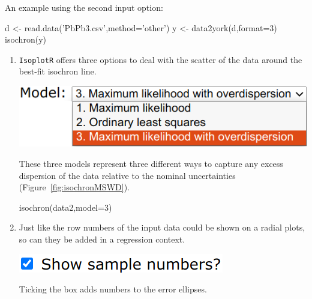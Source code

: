 \begin{refsection}
An example using the second input option:

\begin{script}
d <- read.data('PbPb3.csv',method='other')
y <- data2york(d,format=3)
isochron(y)
\end{script}

\begin{enumerate}

\item \texttt{IsoplotR} offers three options to deal with the scatter of the
  data around the best-fit isochron line.

\noindent\begin{minipage}[t]{.45\linewidth}
\strut\vspace*{-\baselineskip}\newline
\includegraphics[width=\linewidth]{../figures/OtherRegressionModels.png}
\end{minipage}
\begin{minipage}[t]{.55\linewidth}
  These three models represent three different ways to capture any
  excess dispersion of the data relative to the nominal uncertainties
  (Figure~\ref{fig:isochronMSWD}).
\end{minipage}

\begin{console}
isochron(data2,model=3)
\end{console}
  
\item Just like the row numbers of the input data could be shown on a
  radial plots, so can they be added in a regression context.

  \noindent\begin{minipage}[t]{.28\linewidth}
  \strut\vspace*{-\baselineskip}\newline
  \includegraphics[width=\linewidth]{../figures/concordiashownumbers.png}
\end{minipage}
\begin{minipage}[t]{.72\linewidth}
Ticking the box adds numbers to the error ellipses.
\end{minipage}


\end{enumerate}
\end{refsection}
